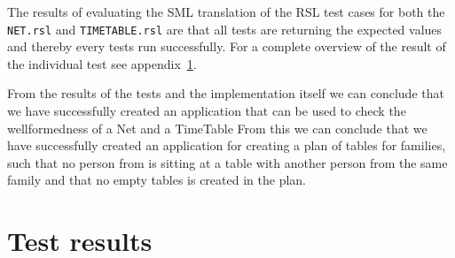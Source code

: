 \documentclass[a4]{article}
\begin{document}
The results of evaluating the SML translation of the RSL test cases for both the \verb=NET.rsl= and \verb=TIMETABLE.rsl= are that all tests are returning the expected values and thereby every tests run successfully. For a complete overview of the result of the individual test see appendix~\ref{app:results}.

From the results of the tests and the implementation itself we can conclude that we have successfully created an application that can be used to check the wellformedness of a Net and a TimeTable
From this we can conclude that we have successfully created an application for creating a plan of tables for families, such that no person from is sitting at a table with another person from the same family and that no empty tables is created in the plan.


\appendix
\section{Test results} \label{app:results}
\end{document}
